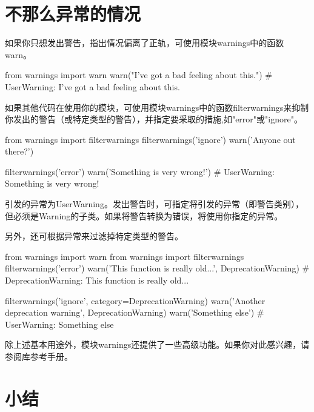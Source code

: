 \section{不那么异常的情况}
如果你只想发出警告，指出情况偏离了正轨，可使用模块warnings中的函数warn。

\begin{pyc}
from warnings import warn
warn("I've got a bad feeling about this.")
# UserWarning: I've got a bad feeling about this.
\end{pyc}

如果其他代码在使用你的模块，可使用模块warnings中的函数filterwarnings来抑制你发出的警告（或特定类型的警告），并指定要采取的措施,如"error"或"ignore"。
\begin{pyc}
from warnings import filterwarnings
filterwarnings('ignore')
warn('Anyone out there?')

filterwarnings('error')
warn('Something is very wrong!')
# UserWarning: Something is very wrong!
\end{pyc}
引发的异常为UserWarning。发出警告时，可指定将引发的异常（即警告类别），但必须是Warning的子类。如果将警告转换为错误，将使用你指定的异常。

另外，还可根据异常来过滤掉特定类型的警告。
\begin{pyc}
from warnings import warn
from warnings import filterwarnings
filterwarnings('error')
warn('This function is really old...', DeprecationWarning)
# DeprecationWarning: This function is really old...

filterwarnings('ignore', category=DeprecationWarning)
warn('Another deprecation warning', DeprecationWarning)
warn('Something else')  # UserWarning: Something else
\end{pyc}

除上述基本用途外，模块warnings还提供了一些高级功能。如果你对此感兴趣，请参阅库参考手册。
\section{小结}

